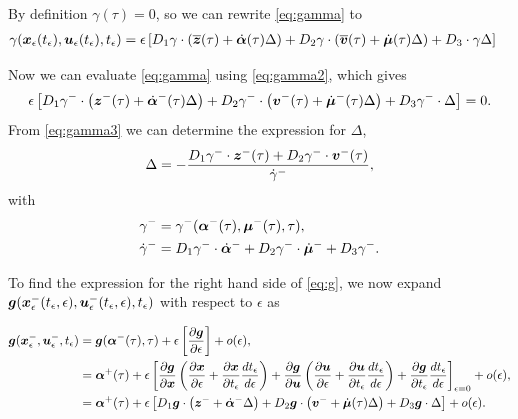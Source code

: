 \documentclass[DC2017114Bouma.tex]{subfiles}
\begin{document}
By definition $\gamma(\tau) = 0$, so we can rewrite \eqref{eq:gamma} to
\begin{align}
\gamma&({\boldsymbol{x}}_\epsilon(t_\epsilon),{\boldsymbol{u}}_\epsilon(t_\epsilon),t_\epsilon) = \epsilon\left[ D_1 \gamma\cdot \left( \overline{{\boldsymbol{z}}}(\tau) + \dot{\boldsymbol{\alpha}}(\tau)\Delta\right) + D_2 \gamma\cdot  \left( \overline{{\boldsymbol{v}}}(\tau) + \dot{\boldsymbol{\mu}}(\tau) \Delta\right) + D_3\cdot  \gamma \Delta \right]\label{eq:gamma2}
\end{align}

Now we can evaluate \eqref{eq:gamma} using \eqref{eq:gamma2}, which gives
\begin{align}
\epsilon\left[ D_1 \gamma^{-}\cdot \left({\boldsymbol{z}}^{-}(\tau) + \dot{\boldsymbol{\alpha}}^{-}(\tau)\Delta\right) + D_2 \gamma^{-}\cdot  \left({\boldsymbol{v}}^{-}(\tau) + \dot{\boldsymbol{\mu}}^{-}(\tau) \Delta\right) + D_3 \gamma^{-}\cdot  \Delta \right] = 0. \label{eq:gamma3}
\end{align}
From \eqref{eq:gamma3} we can determine the expression for $\Delta$,
\begin{align}
\Delta = -\frac{D_1 \gamma^{-} \cdot {\boldsymbol{z}}^{-}(\tau) + D_2 \gamma^{-}\cdot {\boldsymbol{v}}^{-}(\tau)}{\dot{\gamma}^{-}}, \label{eq:Delta}
\end{align}
with
\begin{align}
\gamma^{-} &= \gamma^{-}(\boldsymbol{\alpha}^{-}(\tau),\boldsymbol{\mu}^{-}(\tau),\tau),\\
\dot{\gamma}^{-} &= D_1 \gamma^{-} \cdot \dot{\boldsymbol{\alpha}}^{-} + D_2 \gamma^{-}\cdot  \dot{\boldsymbol{\mu}}^{-} + D_3 \gamma^{-}.
\end{align}

To find the expression for the right hand side of \eqref{eq:g}, we now expand ${\boldsymbol{g}}({\boldsymbol{x}}^{-}_\epsilon(t_\epsilon,\epsilon),{\boldsymbol{u}}^{-}_\epsilon(t_\epsilon,\epsilon),t_\epsilon)$ with respect to $\epsilon$ as

\begin{align}
{\boldsymbol{g}}({\boldsymbol{x}}^{-}_\epsilon,{\boldsymbol{u}}^{-}_\epsilon,t_\epsilon) &= {\boldsymbol{g}}(\boldsymbol{\alpha}^-(\tau),\tau) + \epsilon\left[\frac{\partial{\boldsymbol{g}}}{\partial\epsilon}\right] + o(\epsilon),\\
&= \boldsymbol{\alpha}^+(\tau) + \epsilon\left[\frac{\partial{\boldsymbol{g}}}{\partial{\boldsymbol{x}}}\left(\frac{\partial{\boldsymbol{x}}}{\partial\epsilon} + \frac{\partial{\boldsymbol{x}}}{\partial t_\epsilon}\frac{dt_\epsilon}{d\epsilon} \right) + \frac{\partial{\boldsymbol{g}}}{\partial{\boldsymbol{u}}}\left(\frac{\partial{\boldsymbol{u}}}{\partial\epsilon} + \frac{\partial{\boldsymbol{u}}}{\partial t_\epsilon}\frac{d t_\epsilon}{d\epsilon}\right) + \frac{\partial{\boldsymbol{g}}}{\partial t_\epsilon}\frac{d t_\epsilon}{d\epsilon} \right]_{\epsilon = 0} + o(\epsilon),\\
&= \boldsymbol{\alpha}^+(\tau) + \epsilon\left[D_1{\boldsymbol{g}}\cdot \left({\boldsymbol{z}}^- + \dot{\boldsymbol{\alpha}}^-\Delta\right) + D_2{\boldsymbol{g}}\cdot \left({\boldsymbol{v}}^- + \dot{\boldsymbol{\mu}}(\tau) \Delta\right) + D_3{\boldsymbol{g}}\cdot \Delta\right] + o(\epsilon).\label{eq:gexp}
\end{align}
\end{document}
